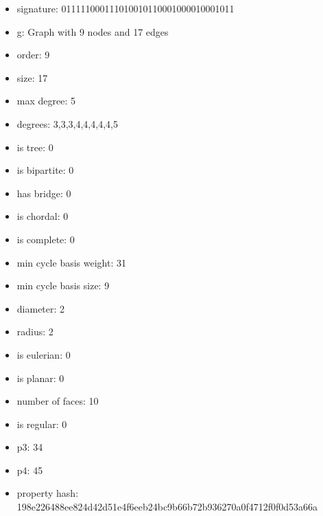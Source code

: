 \newpage
\begin{figure}
\end{figure}
\begin{itemize}
\item signature: 011111000111010010110001000010001011
\item g: Graph with 9 nodes and 17 edges
\item order: 9
\item size: 17
\item max degree: 5
\item degrees: 3,3,3,4,4,4,4,4,5
\item is tree: 0
\item is bipartite: 0
\item has bridge: 0
\item is chordal: 0
\item is complete: 0
\item min cycle basis weight: 31
\item min cycle basis size: 9
\item diameter: 2
\item radius: 2
\item is eulerian: 0
\item is planar: 0
\item number of faces: 10
\item is regular: 0
\item p3: 34
\item p4: 45
\item property hash: 198e226488ee824d42d51e4f6eeb24bc9b66b72b936270a0f4712f0f0d53a66a
\end{itemize}

